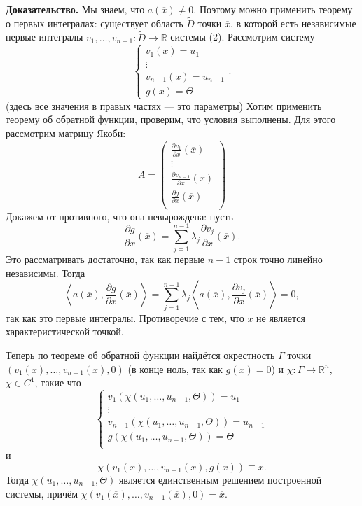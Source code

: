 \textbf{Доказательство.} Мы знаем, что $a(\overline x) \ne 0$.
Поэтому можно применить теорему о первых интегралах: существует область $\widetilde D$ точки $\overline x$, в которой есть независимые первые интегралы $v_1, \dots, v_{n-1}: \widetilde D \to \mathbb R$ системы (2).
Рассмотрим систему
\[
    \begin{cases}
        v_1(x) = u_1 \\
        \vdots \\
        v_{n-1}(x) = u_{n-1} \\
        g(x) = \Theta
    \end{cases}.
\]
(здесь все значения в правых частях --- это параметры)
Хотим применить теорему об обратной функции, проверим, что условия выполнены.
Для этого рассмотрим матрицу Якоби:
\[
    A = 
    \begin{pmatrix}
        \frac{\partial v_1}{\partial x}(\overline x) \\
        \vdots \\
        \frac{\partial v_{n-1}}{\partial x}(\overline x) \\
        \frac{\partial g}{\partial x}(\overline x) \\
    \end{pmatrix}
\]
Докажем от противного, что она невырождена: пусть
\[
    \frac{\partial g}{\partial x}(\overline x) = \sum_{j=1}^{n-1} \lambda_j \frac{\partial v_j}{\partial x}(\overline x).
\]
Это рассматривать достаточно, так как первые $n - 1$ строк точно линейно независимы.
Тогда
\[
    \left< a(\overline x), \frac{\partial g}{\partial x}(\overline x) \right> = \sum_{j=1}^{n-1} \lambda_j \left< a(\overline x), \frac{\partial v_j}{\partial x}(\overline x) \right> = 0,
\]
так как это первые интегралы.
Противоречие с тем, что $\overline x$ не является характеристической точкой.

Теперь по теореме об обратной функции найдётся окрестность $\Gamma$ точки $(v_1(\overline x), \dots, v_{n-1}(\overline x), 0)$ (в конце ноль, так как $g(\overline x) = 0$) и $\chi: \Gamma \to \mathbb R^n$, $\chi \in C^1$, такие что
\[
    \begin{cases}
        v_1(\chi(u_1, \dots, u_{n-1}, \Theta)) = u_1 \\
        \vdots \\
        v_{n-1}(\chi(u_1, \dots, u_{n-1}, \Theta)) = u_{n-1} \\
        g(\chi(u_1, \dots, u_{n-1}, \Theta)) = \Theta \\
    \end{cases}
\]
и
\[
    \chi(v_1(x), \dots, v_{n-1}(x), g(x)) \equiv x.
\]
Тогда $\chi(u_1, \dots, u_{n-1}, \Theta)$ является единственным решением построенной системы, причём $\chi(v_1(\overline x), \dots, v_{n-1}(\overline x), 0) = \overline x$.

